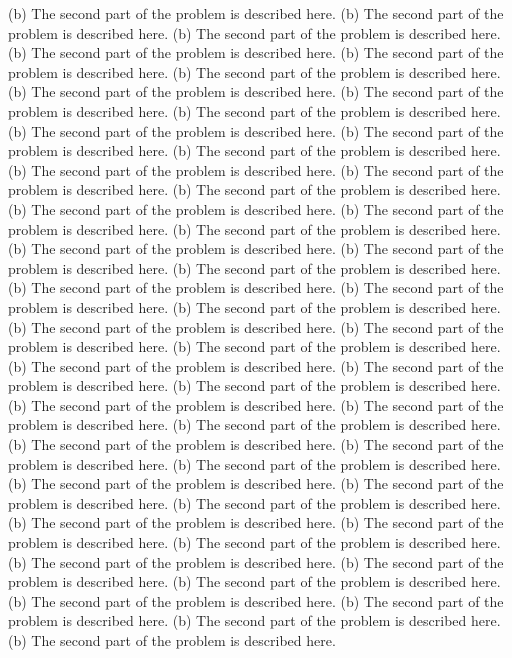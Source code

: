 \begin{multicols}{2}
(b) The second part of the problem is described here.
(b) The second part of the problem is described here.
(b) The second part of the problem is described here.
(b) The second part of the problem is described here.
(b) The second part of the problem is described here.
(b) The second part of the problem is described here.
(b) The second part of the problem is described here.
(b) The second part of the problem is described here.
(b) The second part of the problem is described here.
(b) The second part of the problem is described here.
(b) The second part of the problem is described here.
(b) The second part of the problem is described here.
(b) The second part of the problem is described here.
(b) The second part of the problem is described here.
(b) The second part of the problem is described here.
(b) The second part of the problem is described here.
(b) The second part of the problem is described here.
(b) The second part of the problem is described here.
(b) The second part of the problem is described here.
(b) The second part of the problem is described here.
(b) The second part of the problem is described here.
(b) The second part of the problem is described here.
(b) The second part of the problem is described here.
(b) The second part of the problem is described here.
(b) The second part of the problem is described here.
(b) The second part of the problem is described here.
(b) The second part of the problem is described here.
(b) The second part of the problem is described here.
(b) The second part of the problem is described here.
(b) The second part of the problem is described here.
(b) The second part of the problem is described here.
(b) The second part of the problem is described here.
(b) The second part of the problem is described here.
(b) The second part of the problem is described here.
(b) The second part of the problem is described here.
(b) The second part of the problem is described here.
(b) The second part of the problem is described here.
(b) The second part of the problem is described here.
(b) The second part of the problem is described here.
(b) The second part of the problem is described here.
(b) The second part of the problem is described here.
(b) The second part of the problem is described here.
(b) The second part of the problem is described here.
(b) The second part of the problem is described here.
(b) The second part of the problem is described here.
(b) The second part of the problem is described here.
(b) The second part of the problem is described here.
(b) The second part of the problem is described here.
(b) The second part of the problem is described here.

\end{multicols}
